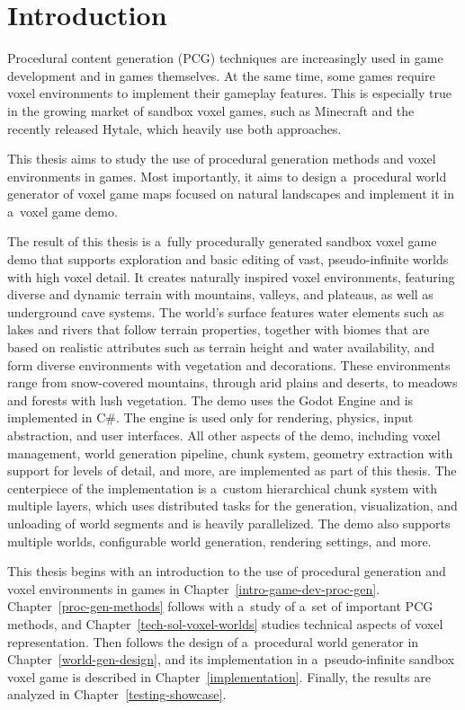
\chapter{Introduction}\label{introduction}


Procedural content generation (PCG) techniques are increasingly used in game development and in games themselves. At the same time, some games require voxel environments to implement their gameplay features. This is especially true in the growing market of sandbox voxel games, such as Minecraft and the recently released Hytale, which heavily use both approaches.

This thesis aims to study the use of procedural generation methods and voxel environments in games. Most importantly, it aims to design a~procedural world generator of voxel game maps focused on natural landscapes and implement it in a~voxel game demo. 

The result of this thesis is a~fully procedurally generated sandbox voxel game demo that supports exploration and basic editing of vast, pseudo-infinite worlds with high voxel detail. It creates naturally inspired voxel environments, featuring diverse and dynamic terrain with mountains, valleys, and plateaus, as well as underground cave systems. The world's surface features water elements such as lakes and rivers that follow terrain properties, together with biomes that are based on realistic attributes such as terrain height and water availability, and form diverse environments with vegetation and decorations. These environments range from snow-covered mountains, through arid plains and deserts, to meadows and forests with lush vegetation. The demo uses the Godot Engine and is implemented in C\#. The engine is used only for rendering, physics, input abstraction, and user interfaces. All other aspects of the demo, including voxel management, world generation pipeline, chunk system, geometry extraction with support for levels of detail, and more, are implemented as part of this thesis. The centerpiece of the implementation is a~custom hierarchical chunk system with multiple layers, which uses distributed tasks for the generation, visualization, and unloading of world segments and is heavily parallelized. The demo also supports multiple worlds, configurable world generation, rendering settings, and more.

This thesis begins with an introduction to the use of procedural generation and voxel environments in games in Chapter~\ref{intro-game-dev-proc-gen}. Chapter~\ref{proc-gen-methods} follows with a~study of a~set of important PCG methods, and Chapter~\ref{tech-sol-voxel-worlds} studies technical aspects of voxel representation. Then follows the design of a~procedural world generator in Chapter~\ref{world-gen-design}, and its implementation in a~pseudo-infinite sandbox voxel game is described in Chapter~\ref{implementation}. Finally, the results are analyzed in Chapter~\ref{testing-showcase}.



